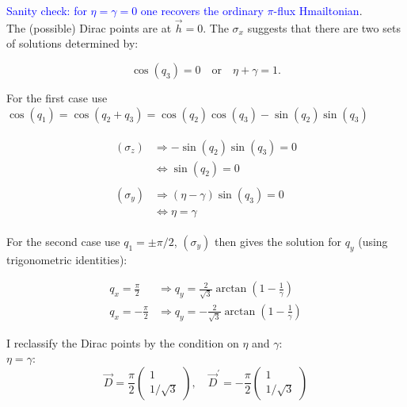 \documentclass[../../../main.tex]{subfiles}
\begin{document}
\textcolor{blue}{Sanity check: for $\eta=\gamma=0$ one recovers the ordinary $\pi$-flux Hmailtonian}. \\

The (possible) Dirac points are at $\vec{h} = 0$. The $\sigma_x$ suggests that there are two sets of solutions determined by:

\begin{equation}
	\cos(q_3) = 0 \quad \text{or} \quad \eta + \gamma = 1.
\end{equation}

For the first case use $\cos(q_1) = \cos(q_2+q_3) = \cos(q_2)\cos(q_3) - \sin(q_2)\sin(q_3)$

\begin{gather*}
	\begin{align}
		(\sigma_z) &\Rightarrow -\sin(q_2)\sin(q_3) = 0 \\
		&\Leftrightarrow \sin(q_2) = 0
	\end{align} \\
	\begin{align}
		(\sigma_y) &\Rightarrow (\eta - \gamma)\sin(q_3) = 0 \\
		&\Leftrightarrow \eta = \gamma 	
	\end{align}
\end{gather*}

For the second case use $q_1 = \pm \pi/2$, $(\sigma_y)$ then gives the solution for $q_y$ (using trigonometric identities):

\begin{align*}
	q_x = \frac{\pi}{2} &\Rightarrow q_y = \frac{2}{\sqrt{3}} \arctan(1-\frac{1}{\gamma}) \\
	q_x = -\frac{\pi}{2} &\Rightarrow q_y = -\frac{2}{\sqrt{3}} \arctan(1-\frac{1}{\gamma})
\end{align*}

I reclassify the Dirac points by the condition on $\eta$ and $\gamma$: \\

\underline{$\eta = \gamma:$} \\

\begin{equation}
	\vec{D} = \frac{\pi}{2}
	\begin{pmatrix}
		1 \\
		1/\sqrt{3}
	\end{pmatrix}, \quad
	\vec{D}^\prime = -\frac{\pi}{2}
	\begin{pmatrix}
		1 \\
		1/\sqrt{3}
	\end{pmatrix}
\end{equation}
\end{document}
